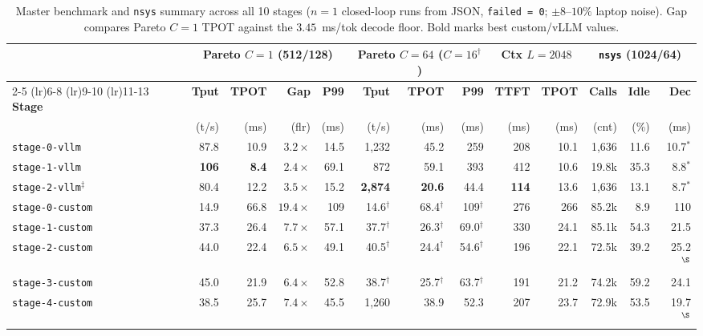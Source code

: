 \documentclass[10pt,twocolumn]{article}
\newcommand{\code}[1]{\texttt{\small #1}}
\newcommand{\stage}[1]{\texttt{\footnotesize #1}}
\begin{document}
\begin{table}[t]
\centering
\caption{Master benchmark and \code{nsys} summary across all 10 stages ($n{=}1$ closed-loop runs from JSON, \code{failed = 0}; $\pm 8$--$10\%$ laptop noise). Gap compares Pareto $C{=}1$ TPOT against the $3.45$~ms/tok decode floor. Bold marks best custom/vLLM values.}
\label{tab:master}
\scriptsize
\setlength{\tabcolsep}{3.1pt}
\begin{tabular}{@{}l rrrr rrr rr rrr@{}}
\toprule
& \multicolumn{4}{c}{\textbf{Pareto $C{=}1$ (512/128)}} & \multicolumn{3}{c}{\textbf{Pareto $C{=}64$ ($C{=}16^\dagger$)}} & \multicolumn{2}{c}{\textbf{Ctx $L{=}2048$}} & \multicolumn{3}{c}{\textbf{\code{nsys} (1024/64)}} \\
\cmidrule(lr){2-5} \cmidrule(lr){6-8} \cmidrule(lr){9-10} \cmidrule(lr){11-13}
\textbf{Stage} & \textbf{Tput} & \textbf{TPOT} & \textbf{Gap} & \textbf{P99} & \textbf{Tput} & \textbf{TPOT} & \textbf{P99} & \textbf{TTFT} & \textbf{TPOT} & \textbf{Calls} & \textbf{Idle} & \textbf{Dec} \\
& (t/s) & (ms) & (flr) & (ms) & (t/s) & (ms) & (ms) & (ms) & (ms) & (cnt) & (\%) & (ms) \\
\midrule
\stage{stage-0-vllm}   & 87.8 & 10.9 & $3.2\times$ & 14.5 & 1,232 & 45.2 & 259 & 208 & 10.1 & 1,636 & 11.6 & 10.7$^*$ \\
\stage{stage-1-vllm}   & \textbf{106} & \textbf{8.4} & $2.4\times$ & 69.1 & 872 & 59.1 & 393 & 412 & 10.6 & 19.8k & 35.3 & 8.8$^*$ \\
\stage{stage-2-vllm}$^\ddagger$ & 80.4 & 12.2 & $3.5\times$ & 15.2 & \textbf{2,874} & \textbf{20.6} & 44.4 & \textbf{114} & 13.6 & 1,636 & 13.1 & 8.7$^*$ \\
\midrule
\stage{stage-0-custom} & 14.9 & 66.8 & $19.4\times$ & 109 & 14.6$^\dagger$ & 68.4$^\dagger$ & 109$^\dagger$ & 276 & 266 & 85.2k & 8.9 & 110 \\
\stage{stage-1-custom} & 37.3 & 26.4 & $7.7\times$ & 57.1 & 37.7$^\dagger$ & 26.3$^\dagger$ & 69.0$^\dagger$ & 330 & 24.1 & 85.1k & 54.3 & 21.5 \\
\stage{stage-2-custom} & 44.0 & 22.4 & $6.5\times$ & 49.1 & 40.5$^\dagger$ & 24.4$^\dagger$ & 54.6$^\dagger$ & 196 & 22.1 & 72.5k & 39.2 & 25.2$^\S$ \\
\stage{stage-3-custom} & 45.0 & 21.9 & $6.4\times$ & 52.8 & 38.7$^\dagger$ & 25.7$^\dagger$ & 63.7$^\dagger$ & 191 & 21.2 & 74.2k & 59.2 & 24.1 \\
\stage{stage-4-custom} & 38.5 & 25.7 & $7.4\times$ & 45.5 & 1,260 & 38.9 & 52.3 & 207 & 23.7 & 72.9k & 53.5 & 19.7$^\S$ \\

\end{tabular}
\end{table}
\end{document}
